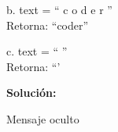 \documentclass[letterpaper,10pt]{article}
\begin{document}
b.	text = `` c o d e r ''\\ Retorna: ``coder''
\vspace{0.5cm}

c.	text = `` ''\\ Retorna: ``'
\vspace{0.5cm}

\textbf{Solución:}

\begin{center}
\begin{minipage}{0.6\textwidth}
\begin{algorithm}[H] %
\begin{algorithmic}[1] %



\end{algorithmic}
\caption{Mensaje oculto} %
\label{alg:oculto} %
\end{algorithm}
\end{minipage}
\end{center}




\end{document}
